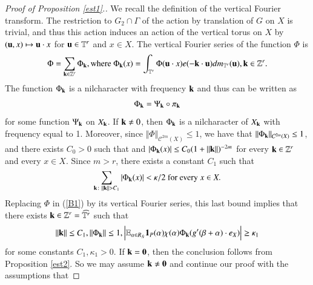 \documentclass[12pt,amstex]{amsart}
\theoremstyle{definition}
\def \A {\alpha}
\def \B {\beta}
\def \D {\kappa}
\def \R {R_{\tilde{N}}}
\def \k {\bold{k}}
\begin{document}
\begin{proof}[Proof of Proposition \ref{est1}.]
   We recall the definition of the vertical Fourier transform. The restriction to $G_{2}\cap\Gamma$ of the action by translation of $G$ on $X$ is trivial, and thus this action induces an action of the vertical torus on $X$ by
$(\bold{u},x)\mapsto\bold{u}\cdot x$ for $\bold{u}\in\mathbb{T}^{r}$ and $x\in X$. The vertical Fourier series of the function $\Phi$ is
\begin{equation}\nonumber
  \begin{split}
    \Phi=\sum_{\k\in\mathbb{Z}^{r}}\Phi_{\k}, \text{where }
    \Phi_{\k}(x)=\int_{\mathbb{T}^{r}}\Phi(\bold{u}\cdot x)e(-\k\cdot\bold{u}) dm_{\mathbb{T}^{r}}(\bold{u}), \k\in\mathbb{Z}^{r}.
  \end{split}
\end{equation}
The function $\Phi_{\k}$ is a nilcharacter with frequency $\k$ and
thus can be written as
\begin{equation}\nonumber
  \begin{split}
    \Phi_{\k}=\Psi_{\k}\circ\pi_{\k}
  \end{split}
\end{equation}
for some function $\Psi_{\k}$ on $X_{\k}$.
If $\k\neq 0$, then $\Phi_{\k}$ is a nilcharacter of $X_{\k}$ with frequency equal to 1. Moreover, since $\Vert\Phi\Vert_{\mathcal{C}^{2m}(X)}\leq 1$, we have that $\Vert\Phi_{\k}\Vert_{\mathcal{C}^{2m}(X)}\leq 1$, and there exists $C_{0}>0$ such that and
$\vert\Phi_{\k}(x)\vert\leq C_{0}(1+\Vert\k\Vert)^{-2m}$ for every $\k\in\mathbb{Z}^{r}$ and every $x\in X$. Since $m>r$, there exists a constant $C_{1}$ such that
\begin{equation}\nonumber
  \begin{split}
    \sum_{\k\colon\Vert\k\Vert>C_{1}}\vert\Phi_{\k}(x)\vert<\D/2
    \text{ for every } x\in X.
  \end{split}
\end{equation}
 Replacing $\Phi$ in (\ref{B1}) by its vertical Fourier series, this last bound implies that there exists $\k\in\mathbb{Z}^{r}=\widehat{\mathbb{T}^{r}}$
   such that
    \begin{equation}\nonumber
  \begin{split}
    \Vert\k\Vert\leq C_{1}, \Vert\Phi_{\k}\Vert\leq 1, \Bigl\vert\mathbb{E}_{\A\in \R}\bold{1}_{P}(\A)\chi(\A)\Phi_{\k}(g'(\B+\A)\cdot e_{X})\Bigr\vert\geq\D_{1}
  \end{split}
  \end{equation}
  for some constants $C_{1},\D_{1}>0$.
   If $\k=\bold{0}$, then the conclusion follows from Proposition \ref{est2}. So we may assume $\k\neq\bold{0}$ and continue our proof with the assumptions that

\end{proof}
\end{document}

